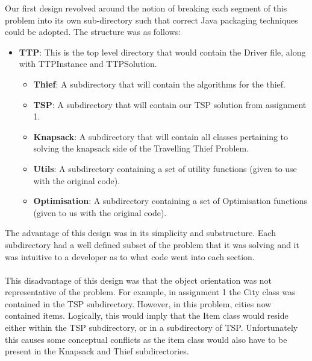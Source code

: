 \documentclass[a4paper,12pt]{article}
\begin{document}
Our first design revolved around the notion of breaking each segment of this problem into its own sub-directory such that correct Java packaging techniques could be adopted. The structure was as follows:
\begin{itemize}
\item \textbf{TTP}: This is the top level directory that would contain the Driver file, along with TTPInstance and TTPSolution.
\begin{itemize}
\item \textbf{Thief}: A subdirectory that will contain the algorithms for the thief.
\item \textbf{TSP}: A subdirectory that will contain our TSP solution from assignment 1.
\item \textbf{Knapsack}: A subdirectory that will contain all classes pertaining to solving the knapsack side of the Travelling Thief Problem.
\item \textbf{Utils}: A subdirectory containing a set of utility functions (given to use with the original code).
\item \textbf{Optimisation}: A subdirectory containing a set of Optimisation functions (given to us with the original code).\\
\end{itemize}

\end{itemize}

The advantage of this design was in its simplicity and substructure. Each subdirectory had a well defined subset of the problem that it was solving and it was intuitive to a developer as to what code went into each section.\\
\\
This disadvantage of this design was that the object orientation was not representative of the problem. For example, in assignment 1 the City class was contained in the TSP subdirectory. However, in this problem, cities now contained items. Logically, this would imply that the Item class would reside either within the TSP subdirectory, or in a subdirectory of TSP. Unfortunately this causes some conceptual conflicts as the item class would also have to be present in the Knapsack and Thief subdirectories.
\end{document}
